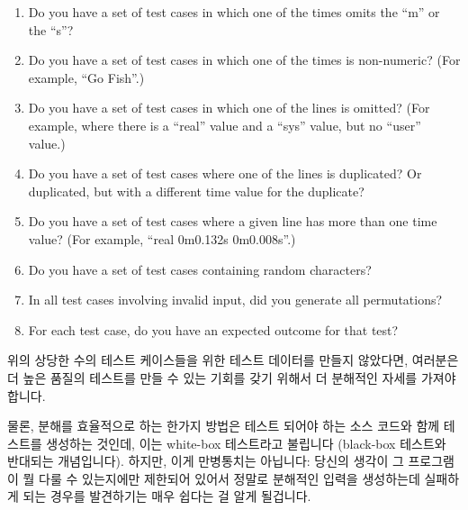{\begin{enumerate}
	\item	Do you have a set of test cases in which one of the
		times omits the ``m'' or the ``s''?
	\item	Do you have a set of test cases in which one of the
		times is non-numeric?  (For example, ``Go Fish''.)
	\item	Do you have a set of test cases in which one of the
		lines is omitted?  (For example, where there is a
		``real'' value and a ``sys'' value, but no ``user''
		value.)
	\item	Do you have a set of test cases where one of the
		lines is duplicated?  Or duplicated, but with a
		different time value for the duplicate?
	\item	Do you have a set of test cases where a given line
		has more than one time value?  (For example,
		``real 0m0.132s 0m0.008s''.)
	\item	Do you have a set of test cases containing random
		characters?
	\item	In all test cases involving invalid input, did you
		generate all permutations?
	\item	For each test case, do you have an expected outcome
		for that test?
	\fi
	\end{enumerate}

	위의 상당한 수의 테스트 케이스들을 위한 테스트 데이터를 만들지
	않았다면, 여러분은 더 높은 품질의 테스트를 만들 수 있는 기회를 갖기
	위해서 더 분해적인 자세를 가져야 합니다.

	물론, 분해를 효율적으로 하는 한가지 방법은 테스트 되어야 하는 소스
	코드와 함께 테스트를 생성하는 것인데, 이는 white-box 테스트라고
	불립니다 (black-box 테스트와 반대되는 개념입니다).
	하지만, 이게 만병통치는 아닙니다: 당신의 생각이 그 프로그램이 뭘 다룰
	수 있는지에만 제한되어 있어서 정말로 분해적인 입력을 생성하는데
	실패하게 되는 경우를 발견하기는 매우 쉽다는 걸 알게 될겁니다.

} \QuickQuizEnd

